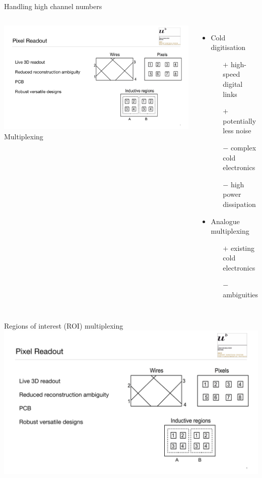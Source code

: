 \documentclass[]{beamer}
\newcommand*{\emphcol}{red}
\begin{document}
\begin{frame}{Handling high channel numbers}
	\begin{columns}[c]
		\centering
		\includegraphics[page=1, viewport=930 90 1850 800, clip, width=\textwidth]{defence/Pixels}\\
		Multiplexing
		\begin{itemize}
			\item Cold digitisation
			\begin{itemize}
				\item[$+$] high-speed digital links
				\item[$+$] potentially less noise
				\item[$-$] complex cold electronics
				\item[$-$] high power dissipation
			\end{itemize}
			\item {\color{\emphcol} Analogue multiplexing}
			\begin{itemize}
				\item[$+$] existing cold electronics
				\item[$-$] ambiguities
			\end{itemize}
		\end{itemize}
	\end{columns}
\end{frame}

\begin{frame}{Regions of interest (ROI) multiplexing}
	\centering
	\includegraphics[page=2, viewport=20 0 1770 845, clip, width=\textwidth]{defence/Pixels}
\end{frame}
\end{document}
